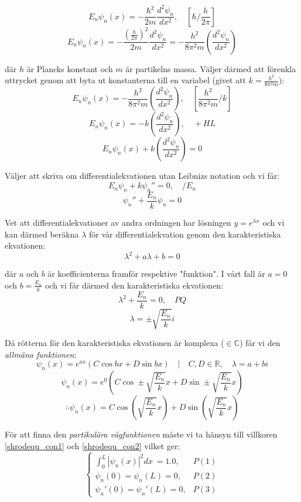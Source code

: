 \documentclass{article}
\newcommand{\shrodequ}{E_n \psi_n(x) = - \frac{\hbar^2}{2m} \frac{d^2 \psi_n}{dx^2}}
\newcommand{\shrodprob}{|\psi_n(x)|^2}
\begin{document}
$$
\shrodequ, \quad \left[\hbar / \frac{h}{2\pi}\right]
$$
$$
E_n\psi_n(x) = - \frac{\left(\frac{h}{2\pi}\right)^2}{2m} \frac{d^2 \psi_n}{dx^2} = - \frac{h^2}{8 \pi^2 m} \left(\frac{d^2 \psi_n}{dx^2}\right)
$$

där $h$ är Plancks konstant och $m$ är partikelns massa. Väljer därmed att förenkla uttrycket genom att byta ut konstanterna till en variabel (givet att $k = \frac{h^2}{8 \pi ^2 m}$):
$$
E_n\psi_n(x) = - \frac{h^2}{8 \pi ^2 m} \left(\frac{d^2 \psi_n}{dx^2}\right), \quad \left[\frac{h^2}{8 \pi ^2 m}/k\right]
$$
$$
E_n\psi_n(x) = -k\left(\frac{d^2 \psi_n}{dx^2}\right), \quad + HL
$$
$$
E_n\psi_n(x) + k\left(\frac{d^2 \psi_n}{dx^2}\right) = 0
$$

Väljer att skriva om differentialekvationen utan Leibnizs notation och vi får:
$$
E_n\psi_n + k \psi_n'' = 0, \quad /E_n 
$$
$$
\psi_n'' + \frac{E_n}{k}\psi_n = 0 
$$

Vet att differentialekvationer av andra ordningen har lösningen $y=e^{\lambda x}$ och vi kan därmed beräkna $\lambda$ för vår differentialekvation genom den karakteristiska ekvationen:
$$
\lambda^2 + a\lambda + b = 0
$$

där $a$ och $b$ är koefficienterna framför respektive "funktion". I vårt fall är $a=0$ och $b = \frac{E_n}{k}$ och vi får därmed den karakteristiska ekvationen:
$$
\lambda^2 + \frac{E_n}{k} = 0, \quad PQ	
$$
$$
\lambda = \pm \sqrt{\frac{E_n}{k}}i
$$

Då rötterna för den karakteristiska ekvationen är komplexa ($\in \mathbb{C}$) får vi den \emph{allmäna funktionen}:
$$
\psi_n(x) = e^{ax}\left(C \cos bx + D \sin bx\right) \quad | \quad C,D \in \mathbb{R}, \quad \lambda = a + bi
$$
$$
\psi_n(x) = e^{0}\left( C \cos \pm\sqrt{\frac{E_n}{k}}x + D \sin \pm\sqrt{\frac{E_n}{k}}x \right) 
$$
\begin{equation} \label{psi_gen}
\therefore \psi_n(x) = C \cos \left(\sqrt{\frac{E_n}{k}}x\right) + D \sin \left(\sqrt{\frac{E_n}{k}}x\right)
\end{equation}

För att finna den \emph{partikulära vågfunktionen} måste vi ta hänsyn till villkoren \ref{shrodequ_con1} och \ref{shrodequ_con2} vilket ger:
$$
\begin{cases}
	\int_0^L \shrodprob dx\ = 1.0, & P(1) \\
	\psi_n(0) = \psi_n(L) = 0, & P(2) \\
	\psi_n'(0) = \psi_n'(L) = 0, & P(3) 
\end{cases}
$$
\end{document}
